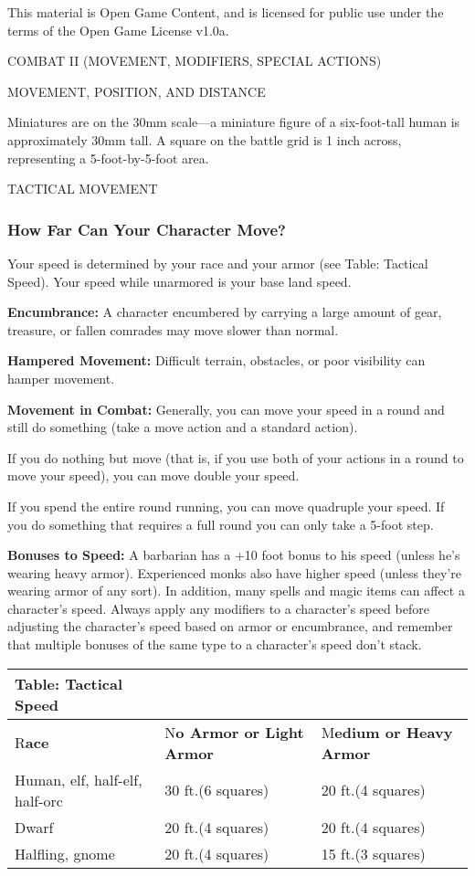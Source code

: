 \documentclass{article}
\begin{document}
This material is Open Game Content, and is licensed for public use under the terms 
of the Open Game License v1.0a.

{\LARGE{}COMBAT II (MOVEMENT, MODIFIERS, SPECIAL ACTIONS)}

\vspace{12pt}
{\LARGE{}MOVEMENT, POSITION, AND DISTANCE}

Miniatures are on the 30mm scale---a miniature figure of a six-foot-tall human 
is approximately 30mm tall. A square on the battle grid is 1 inch across, representing 
a 5-foot-by-5-foot area.

\vspace{12pt}
TACTICAL MOVEMENT

\subsubsection*{\textbf{How Far Can Your Character Move?}}

Your speed is determined by your race and your armor (see Table: Tactical Speed). 
Your speed while unarmored is your base land speed.

\textbf{Encumbrance:} A character encumbered by carrying a large amount of gear, 
treasure, or fallen comrades may move slower than normal.

\textbf{Hampered Movement:} Difficult terrain, obstacles, or poor visibility can 
hamper movement.

\textbf{Movement in Combat:} Generally, you can move your speed in a round and 
still do something (take a move action and a standard action).

If you do nothing but move (that is, if you use both of your actions in a round 
to move your speed), you can move double your speed.

If you spend the entire round running, you can move quadruple your speed. If you 
do something that requires a full round you can only take a 5-foot step.

\textbf{Bonuses to Speed:} A barbarian has a +10 foot bonus to his speed (unless 
he's wearing heavy armor). Experienced monks also have higher speed (unless they're 
wearing armor of any sort). In addition, many spells and magic items can affect 
a character's speed. Always apply any modifiers to a character's speed before adjusting 
the character's speed based on armor or encumbrance, and remember that multiple 
bonuses of the same type to a character's speed don't stack.

\vspace{12pt}
\begin{tabular}{|>{\raggedright}p{107pt}|>{\raggedright}p{105pt}|>{\raggedright}p{101pt}|}
\hline
T\textbf{able: Tactical Speed} &  & \tabularnewline
\hline
R\textbf{ace } & N\textbf{o Armor or Light Armor} & M\textbf{edium or Heavy Armor}\tabularnewline
\hline
Human, elf, half-elf, half-orc & 30 ft.(6 squares) & 20 ft.(4 squares)\tabularnewline
\hline
Dwarf & 20 ft.(4 squares) & 20 ft.(4 squares)\tabularnewline
\hline
Halfling, gnome & 20 ft.(4 squares) & 15 ft.(3 squares)\tabularnewline
\hline
\end{tabular}
\end{document}
